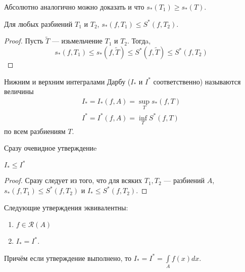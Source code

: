 Абсолютно аналогично можно доказать и что $s_*(T_1) \geqslant s_*(T)$.
\begin{Statement}
    Для любых разбиений $T_1$ и $T_2$, $s_*(f, T_1) \leqslant S^*(f, T_2)$.
\end{Statement}
\begin{proof}
    Пусть $\widetilde{T}$ --- изьмельчение $T_1$ и $T_2$. Тогдa,
    $$
        s_*(f, T_1) \leqslant s_*(f, \widetilde{T}) \leqslant S^*(f, \widetilde{T}) \leqslant S^*(f, T_2)
    $$
\end{proof}
\begin{Def}
    Нижним и верхним интегралами Дарбу ($I_*$ и $I^*$ соответственно) называются величины
    \begin{gather}
        I_* = I_*(f, A) = \sup_{T} s_*(f,T)\\
        I^* = I^*(f, A) = \inf_{T} S^*(f, T)
    \end{gather}
    по всем разбиениям $T$.
\end{Def}
Сразу очевидное утверждениe
\begin{Statement}
    $I_* \leqslant I^*$
\end{Statement}
\begin{proof}
    Сразу следует из того, что для всяких $T_1, T_2$ --- разбиений $A$, $s_*(f, T_1) \leqslant S^*(f, T_2)$ и $I_* \leqslant S^*(f, T_2)$.
\end{proof}
\begin{Theorem}
Следующие утверждения эквивалентны:
\begin{enumerate}
    \item $f \in \mathcal{R}(A)$
    \item $I_* = I^*$.
\end{enumerate}
Причём если утверждение выполнено, то $I_* = I^* = \int\limits_{A}f(x) dx$.
\end{Theorem}
